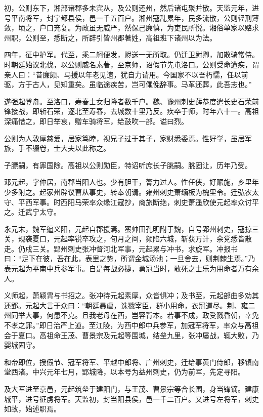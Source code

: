 \documentclass[12pt,UTF8]{ctexbook}
\begin{document}
初，公则东下，湘部诸郡多未宾从，及公则还州，然后诸屯聚并散。天监元年，进号平南将军，封宁都县侯，邑一千五百户。湘州寇乱累年，民多流散，公则轻刑薄敛，顷之，户口充复。为政虽无威严，然保己廉慎，为吏民所悦。湘俗单家以赂求州职，公则至，悉断之，所辟引皆州郡著姓，高祖班下诸州以为法。

四年，征中护军。代至，乘二舸便发，赆送一无所取。仍迁卫尉卿，加散骑常侍。时朝廷始议北伐，以公则威名素著，至京师，诏假节先屯洛口。公则受命遘疾，谓亲人曰：“昔廉颇、马援以年老见遗，犹自力请用。今国家不以吾朽懦，任以前驱，方于古人，见知重矣。虽临途疾苦，岂可僶俛辞事。马革还葬，此吾志也。”

遂强起登舟。至洛口，寿春士女归降者数千户。魏、豫州刺史薛恭度遣长史石荣前锋接战，即斩石荣，逐北至寿春，去城数十里乃反。疾卒于师，时年六十一。高祖深痛惜之，即日举哀，赠车骑将军，给鼓吹一部。谥曰烈。

公则为人敦厚慈爱，居家笃睦，视兄子过于其子，家财悉委焉。性好学，虽居军旅，手不辍卷，士大夫以此称之。

子膘嗣，有罪国除。高祖以公则勋臣，特诏听庶长子朓嗣。朓固让，历年乃受。

邓元起，字仲居，南郡当阳人也。少有胆干，膂力过人。性任侠，好赈施，乡里年少多附之。起家州辟议曹从事史，转奉朝请。雍州刺史萧缅板为槐里令。迁弘农太守、平西军事。时西阳马荣率众缘江寇抄，商旅断绝，刺史萧遥欣使元起率众讨平之。迁武宁太守。

永元末，魏军逼义阳，元起自郡援焉。蛮帅田孔明附于魏，自号郢州刺史，寇掠三关，规袭夏口，元起率锐卒攻之，旬月之间，频陷六城，斩获万计，余党悉皆散走。仍戍三关。郢州刺史张冲督河北军事，元起累与冲书，求旋军。冲报书曰：“足下在彼，吾在此，表里之势，所谓金城汤池；一旦舍去，则荆棘生焉。”乃表元起为平南中兵参军事。自是每战必捷，勇冠当时，敢死之士乐为用命者万有余人。

义师起，萧颖胄与书招之。张冲待元起素厚，众皆惧冲；及书至，元起部曲多劝其还郢。元起大言于众曰：“朝廷暴虐，诛戮宰臣，群小用命，衣冠道尽。荆、雍二州同举大事，何患不克。且我老母在西，岂容背本。若事不成，政受戮昏朝，幸免不孝之罪。”即日治严上道。至江陵，为西中郎中兵参军，加冠军将军，率众与高祖会于夏口。高祖命王茂、曹景宗及元起等围城，结垒九里，张冲屡战，辄大败，乃婴城固守。

和帝即位，授假节、冠军将军、平越中郎将、广州刺史，迁给事黄门侍郎，移镇南堂西渚。中兴元年七月，郢城降，以本号为益州刺史，仍为前军，先定寻阳。

及大军进至京邑，元起筑垒于建阳门，与王茂、曹景宗等合长围，身当锋镝。建康城平，进号征虏将军。天监初，封当阳县侯，邑一千二百户。又进号左将军，刺史如故，始述职焉。
\end{document}
